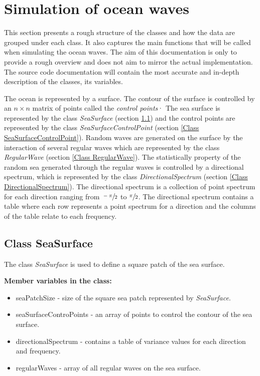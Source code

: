 \section{Simulation of ocean waves} \label{Simulation of ocean waves}

This section presents a rough structure of the classes and how the data are 
grouped under each class. It also captures the main functions that will be
called when simulating the ocean waves. The aim of this documentation is only to
provide a rough overview and does not aim to mirror the actual implementation. 
The source code documentation will contain the most accurate and in-depth 
description of the classes, its variables. 

The ocean is represented by a surface. The contour of the surface is controlled
by an $n \times n$ matrix of points called the \textit{control points}· The sea
surface is represented by the class \textit{SeaSurface} (section 
\ref{Class SeaSurface}) and the control points are represented by the class
\textit{SeaSurfaceControlPoint} (section \ref{Class SeaSurfaceControlPoint}). 
Random waves are generated on the surface by the interaction of several regular 
waves which are represented by the class \textit{RegularWave} (section 
\ref{Class RegularWave}). The statistically property of the random sea generated 
through the regular waves is controlled by a directional spectrum, which is 
represented by the class \textit{DirectionalSpectrum} (section 
\ref{Class DirectionalSpectrum}). The directional spectrum is a collection of 
point spectrum for each direction ranging from $\sfrac{-\pi}{2}$ to 
$\sfrac{\pi}{2}$.  The directional spectrum contains a table where each row 
represents a point spectrum for a direction and the columns of the table relate 
to each frequency.

\subsection{Class SeaSurface} \label{Class SeaSurface}

The class \textit{SeaSurface} is used to define a square patch of the sea 
surface.

\textbf{Member variables in the class:}
\begin{itemize}
  \item seaPatchSize - size of the square sea patch represented by 
    \textit{SeaSurface}.
  \item seaSurfaceControPoints - an array of points to control the contour of 
    the sea surface.
  \item directionalSpectrum - contains a table of variance values for each
    direction and frequency.
  \item regularWaves - array of all regular waves on the sea surface.
\end{itemize}

